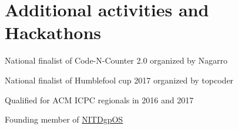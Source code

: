 \documentclass[a4paper]{deedy-resume} %
\begin{document}
\begin{minipage}[t]{0.66\textwidth}
\section{Additional activities and Hackathons}

\sectionspace

\begin{tightitemize}
\item National finalist of Code-N-Counter 2.0 organized by Nagarro\\
\item National finalist of Humblefool cup 2017 organized by topcoder\\
\item Qualified for ACM ICPC regionals in 2016 and 2017\\
\item Founding member of \href{https://github.com/NITDgpOS}{NITDgpOS}
\end{tightitemize}


\end{minipage} %
\end{document}
